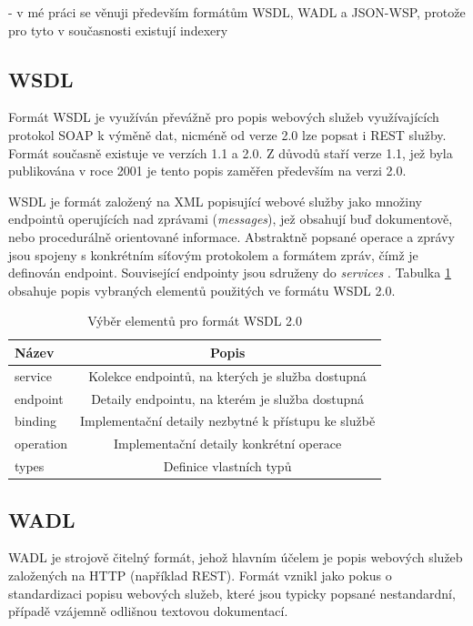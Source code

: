 \documentclass[czech,DP]{thesiskiv}
\begin{document}
- v mé práci se věnuji především formátům WSDL, WADL a JSON-WSP, protože pro tyto v současnosti existují indexery

\subsection{WSDL}

Formát WSDL je využíván převážně pro popis webových služeb využívajících protokol SOAP k výměně dat, nicméně od verze 2.0 lze popsat i REST služby. Formát současně existuje ve verzích 1.1 a 2.0. Z důvodů staří verze 1.1, jež byla publikována v roce 2001 je tento popis zaměřen především na verzi 2.0. 

WSDL je formát založený na XML popisující webové služby jako množiny endpointů operujících nad zprávami (\textit{messages}), jež obsahují buď dokumentově, nebo procedurálně orientované informace. Abstraktně popsané operace a zprávy jsou spojeny s konkrétním síťovým protokolem a formátem zpráv, čímž je definován endpoint. Související endpointy jsou sdruženy do \textit{services} \cite{wsdl2}. Tabulka \ref{tab:wsdl-elements} obsahuje popis vybraných elementů použitých ve formátu WSDL 2.0.

\begin{table}[h]
	\centering
	\begin{tabular}{|l|c|}
		\hline
		Název & Popis \\
		\hline
		\hline
		service & Kolekce endpointů, na kterých je služba dostupná \\
		\hline
		endpoint & Detaily endpointu, na kterém je služba dostupná \\
		\hline
		binding & Implementační detaily nezbytné k přístupu ke službě \\
		\hline
		operation & Implementační detaily konkrétní operace \\
		\hline
		types & Definice vlastních typů \\
		\hline
		
	\end{tabular}
	\caption{Výběr elementů pro formát WSDL 2.0}
	\label{tab:wsdl-elements} 
\end{table}
 
\subsection{WADL}

WADL je strojově čitelný formát, jehož hlavním účelem je popis webových služeb založených na HTTP (například REST). Formát vznikl jako pokus o standardizaci popisu webových služeb, které jsou typicky popsané nestandardní, případě vzájemně odlišnou textovou dokumentací\cite{wadlSpec}.
\end{document}
